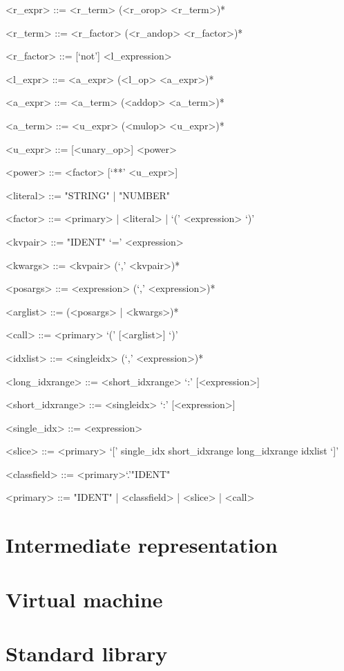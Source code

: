 \documentclass[10pt,a4paper]{article}
\begin{document}
\begin{grammar}
<r_expr> ::= <r_term> (<r_orop> <r_term>)*

<r_term> ::= <r_factor> (<r_andop> <r_factor>)*

<r_factor> ::= [`not'] <l_expression>

<l_expr> ::= <a_expr> (<l_op> <a_expr>)*

<a_expr> ::= <a_term> (<addop> <a_term>)*

<a_term> ::= <u_expr> (<mulop> <u_expr>)*

<u_expr> ::= [<unary_op>] <power>

<power> ::= <factor> [`**' <u_expr>]

<literal> ::= "STRING" | "NUMBER"

<factor> ::= <primary> | <literal> | `(' <expression> `)'

<kvpair> ::= "IDENT" `=' <expression>

<kwargs> ::= <kvpair> (`,' <kvpair>)*

<posargs> ::= <expression> (`,' <expression>)*

<arglist> ::= (<posargs> | <kwargs>)*

<call> ::= <primary> `(' [<arglist>] `)'

<idxlist> ::= <singleidx> (`,' <expression>)*

<long_idxrange> ::= <short_idxrange> `:' [<expression>]

<short_idxrange> ::= <singleidx> `:' [<expression>] 

<single_idx> ::= <expression>

<slice> ::= <primary> `[' single_idx \alt short_idxrange \alt long_idxrange \alt idxlist `]'

<classfield> ::= <primary>`.'"IDENT"

<primary> ::= "IDENT" | <classfield> | <slice> | <call>


\end{grammar}



\pagebreak

\section{Intermediate representation}

\pagebreak

\section{Virtual machine}

\pagebreak

\section{Standard library}
\end{document}
